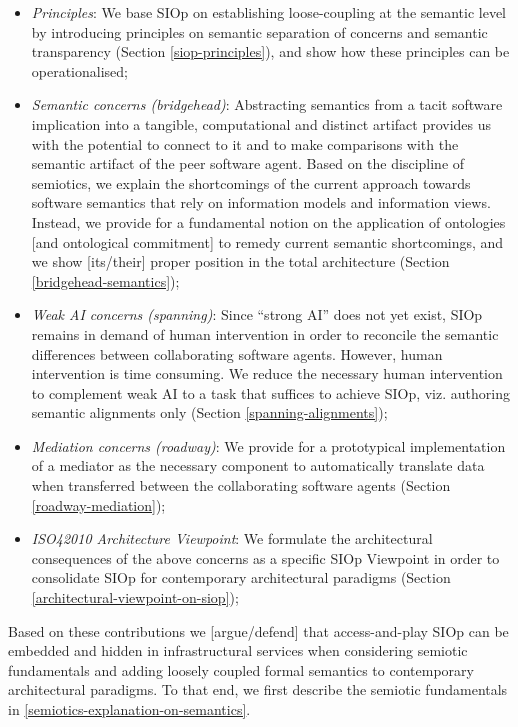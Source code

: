 \documentclass[a4paper,11pt,oneside,oldfontcommands]{memoir}
\newcounter{para}
\theoremstyle{definition}
\theoremstyle{break}		%
\numberwithin{equation}{chapter}
\numberwithin{figure}{chapter}
\begin{document}
\begin{itemize}
\tightlist
\item
  \emph{Principles}: We base SIOp on establishing loose-coupling at the
  semantic level by introducing principles on semantic separation of
  concerns and semantic transparency (Section \ref{siop-principles}),
  and show how these principles can be operationalised;
\item
  \emph{Semantic concerns (bridgehead)}: Abstracting semantics from a
  tacit software implication into a tangible, computational and distinct
  artifact provides us with the potential to connect to it and to make
  comparisons with the semantic artifact of the peer software agent.
  Based on the discipline of semiotics, we explain the shortcomings of
  the current approach towards software semantics that rely on
  information models and information views. Instead, we provide for a
  fundamental notion on the application of ontologies {[}and ontological
  commitment{]} to remedy current semantic shortcomings, and we show
  {[}its/their{]} proper position in the total architecture (Section
  \ref{bridgehead-semantics});
\item
  \emph{Weak AI concerns (spanning)}: Since ``strong AI'' does not yet
  exist, SIOp remains in demand of human intervention in order to
  reconcile the semantic differences between collaborating software
  agents. However, human intervention is time consuming. We reduce the
  necessary human intervention to complement weak AI to a task that
  suffices to achieve SIOp, viz. authoring semantic alignments only
  (Section \ref{spanning-alignments});
\item
  \emph{Mediation concerns (roadway)}: We provide for a prototypical
  implementation of a mediator as the necessary component to
  automatically translate data when transferred between the
  collaborating software agents (Section \ref{roadway-mediation});
\item
  \emph{ISO42010 Architecture Viewpoint}: We formulate the architectural
  consequences of the above concerns as a specific SIOp Viewpoint in
  order to consolidate SIOp for contemporary architectural paradigms
  (Section \ref{architectural-viewpoint-on-siop});
\end{itemize}

Based on these contributions we {[}argue/defend{]} that access-and-play
SIOp can be embedded and hidden in infrastructural services when
considering semiotic fundamentals and adding loosely coupled formal
semantics to contemporary architectural paradigms. To that end, we first
describe the semiotic fundamentals in
\cref{semiotics-explanation-on-semantics}.
\end{document}

